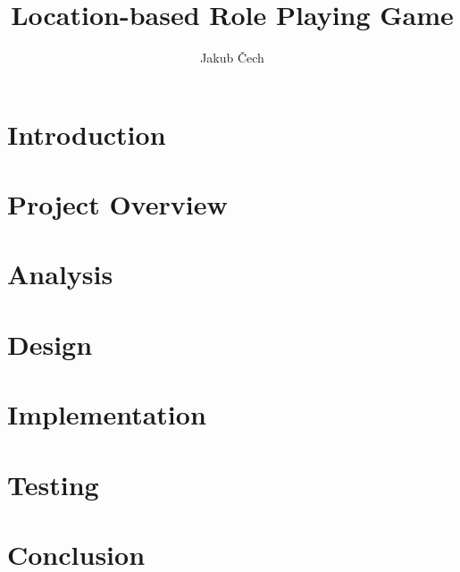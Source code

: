 \documentclass[thesis=B,english]{FITthesis}[2012/10/20]
\title{Location-based Role Playing Game}
\author{Jakub Čech} %
\begin{document}
	
	\chapter{Introduction}
		
	
	\chapter{Project Overview}
	
	
	\chapter{Analysis}
	
	
	\chapter{Design}
	
	
	\chapter{Implementation}
	
	
	\chapter{Testing}
	
	
	\chapter{Conclusion}
	
	
	\printbibliography
	
	\appendix
	
\end{document}
